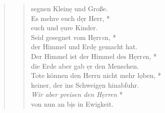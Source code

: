 \begin{quote}
\begin{verse}
segnen Klein\d e und Große.\\ 
\vin Es mehre euch d\d er Herr, *\\ 
\vin euch und \d eure Kinder.\\  
Seid gesegnet vom H\d err\textit{e}n, *\\ 
der Himmel und Erd\d e gemacht hat.\\ 
\vin Der Himmel ist der Himmel des H\d err\textit{e}n, *\\ 
\vin die Erde aber gab \d er den Menschen.\\  
Tote können den Herrn nicht mehr l\d oben, *\\ 
keiner, der ins Schweig\d en hinabfuhr.\\ 
\vin \textit{Wir aber preisen den H\d err\textit{e}n} *\\ 
\vin von nun an b\d is in Ewigkeit.\\ 

\end{verse}
\end{quote}

\medskip
\vspace{0.3cm}
\def\greinitialformat#1{{\fontsize{40}{40}\selectfont #1}}
\gresetfirstlineaboveinitial{\small \textcolor{red}{ Eph 1}}{}
\setaboveinitialseparation{0.72mm}


\newpage


